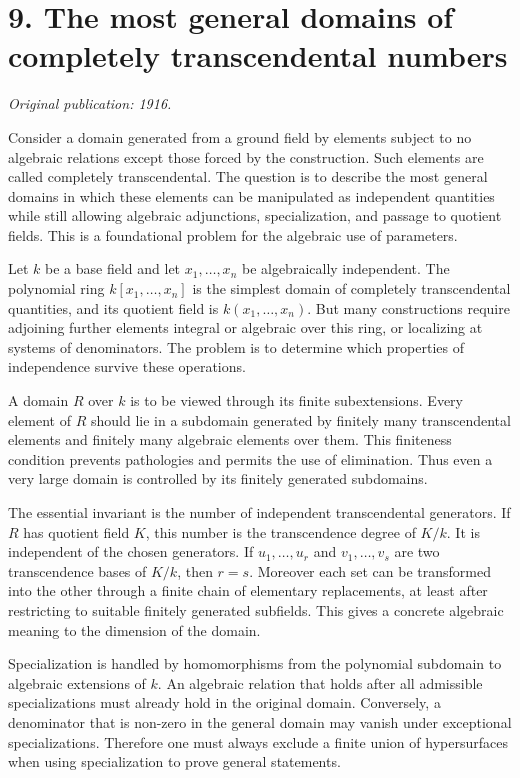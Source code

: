 \documentclass[12pt]{article}
\begin{document}
\section{9. The most general domains of completely transcendental numbers}

\textit{Original publication: 1916.}

Consider a domain generated from a ground field by elements subject to no algebraic relations except
those forced by the construction. Such elements are called completely transcendental. The question
is to describe the most general domains in which these elements can be manipulated as independent
quantities while still allowing algebraic adjunctions, specialization, and passage to quotient
fields. This is a foundational problem for the algebraic use of parameters.


Let \(k\) be a base field and let \(x_1, \ldots,x_n\) be algebraically independent. The polynomial
ring \(k[x_1, \ldots,x_n]\) is the simplest domain of completely transcendental quantities, and its
quotient field is \(k(x_1, \ldots,x_n)\). But many constructions require adjoining further elements
integral or algebraic over this ring, or localizing at systems of denominators. The problem is to
determine which properties of independence survive these operations.


A domain \(R\) over \(k\) is to be viewed through its finite subextensions. Every element of \(R\)
should lie in a subdomain generated by finitely many transcendental elements and finitely many
algebraic elements over them. This finiteness condition prevents pathologies and permits the use of
elimination. Thus even a very large domain is controlled by its finitely generated subdomains.


The essential invariant is the number of independent transcendental generators. If \(R\) has
quotient field \(K\), this number is the transcendence degree of \(K/k\). It is independent of the
chosen generators. If \(u_1, \ldots,u_r\) and \(v_1, \ldots,v_s\) are two transcendence bases of
\(K/k\), then \(r=s\). Moreover each set can be transformed into the other through a finite chain of
elementary replacements, at least after restricting to suitable finitely generated subfields. This
gives a concrete algebraic meaning to the dimension of the domain.


Specialization is handled by homomorphisms from the polynomial subdomain to algebraic extensions of
\(k\). An algebraic relation that holds after all admissible specializations must already hold in
the original domain. Conversely, a denominator that is non-zero in the general domain may vanish
under exceptional specializations. Therefore one must always exclude a finite union of hypersurfaces
when using specialization to prove general statements.
\end{document}
